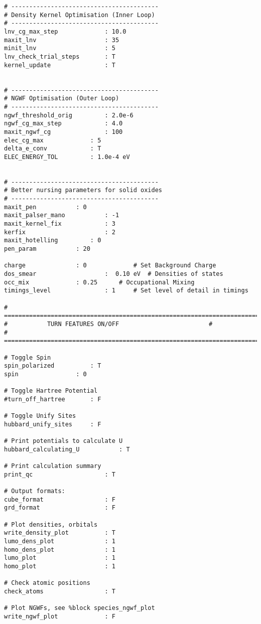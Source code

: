 \begin{lstlisting}
# -----------------------------------------
# Density Kernel Optimisation (Inner Loop)
# -----------------------------------------
lnv_cg_max_step      		: 10.0
maxit_lnv            		: 35
minit_lnv            		: 5
lnv_check_trial_steps 		: T             
kernel_update       		: T         	


# -----------------------------------------
# NGWF Optimisation (Outer Loop)
# -----------------------------------------
ngwf_threshold_orig  		: 2.0e-6     	
ngwf_cg_max_step     		: 4.0       	
maxit_ngwf_cg        		: 100       	
elec_cg_max 			: 5             
delta_e_conv 			: T             
ELEC_ENERGY_TOL   		: 1.0e-4 eV    	


# -----------------------------------------
# Better nursing parameters for solid oxides
# -----------------------------------------
maxit_pen 			: 0              
maxit_palser_mano    		: -1       	
maxit_kernel_fix     		: 3       	
kerfix               		: 2       	
maxit_hotelling 		: 0        	
pen_param 			: 20            

charge 				: 0             # Set Background Charge
dos_smear           		:  0.10 eV	# Densities of states	
occ_mix				: 0.25		# Occupational Mixing 	
timings_level        		: 1		# Set level of detail in timings

# ========================================================================
# 			TURN FEATURES ON/OFF	        			 #
# ========================================================================

# Toggle Spin
spin_polarized 			: T
spin 				: 0   		

# Toggle Hartree Potential
#turn_off_hartree 		: F

# Toggle Unify Sites
hubbard_unify_sites		: F		

# Print potentials to calculate U
hubbard_calculating_U           : T

# Print calculation summary
print_qc             		: T

# Output formats:
cube_format          		: F       	
grd_format           		: F

# Plot densities, orbitals
write_density_plot   		: T
lumo_dens_plot       		: 1      	
homo_dens_plot       		: 1
lumo_plot            		: 1     
homo_plot            		: 1

# Check atomic positions
check_atoms          		: T       	

# Plot NGWFs, see %block species_ngwf_plot
write_ngwf_plot      		: F       	


\end{lstlisting}
